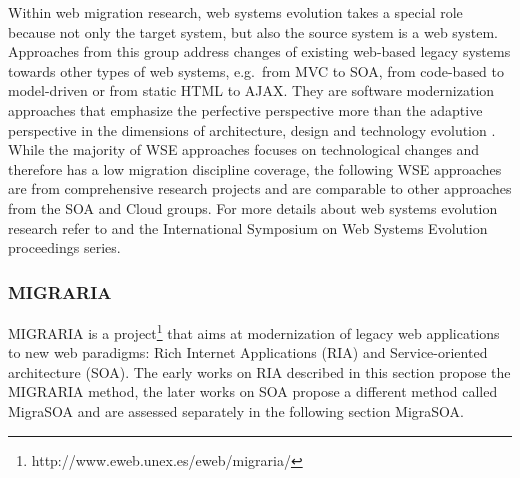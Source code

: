 Within web migration research, web systems evolution takes a special role because not only the target system, but also the source system is a web system.
Approaches from this group address changes of existing web-based legacy systems towards other types of web systems, e.g.~from MVC to SOA, from code-based to model-driven or from static HTML to AJAX.
They are software modernization approaches that emphasize the perfective perspective more than the adaptive perspective \autocite{ISO/IEEE2006SoftwareLifeCycle} in the dimensions of architecture, design and technology evolution \autocite{Kienle2014EvolutionWeb}.
While the majority of WSE approaches focuses on technological changes and therefore has a low migration discipline coverage, the following WSE approaches are from comprehensive research projects and are comparable to other approaches from the SOA and Cloud groups.
For more details about web systems evolution research refer to \autocite{Kienle2014EvolutionWeb} and the International Symposium on Web Systems Evolution proceedings series.

\hypertarget{migraria}{%
\subsubsection{MIGRARIA}\label{migraria}}

MIGRARIA \autocite{Sosa2014MigraSOA,Sosa2013MigraSOA,Rodriguez-Echeverria2012MIGRARIA,Rodriguez-Echeverria2010MIGRARIA} is a project\footnote{http://www.eweb.unex.es/eweb/migraria/} that aims at modernization of legacy web applications to new web paradigms: Rich Internet Applications (RIA) and Service-oriented architecture (SOA).
The early works on RIA \autocite{Rodriguez-Echeverria2012MIGRARIA,Rodriguez-Echeverria2010MIGRARIA} described in this section propose the MIGRARIA method, the later works on SOA \autocite{Sosa2014MigraSOA,Sosa2013MigraSOA} propose a different method called MigraSOA and are assessed separately in the following section MigraSOA.

